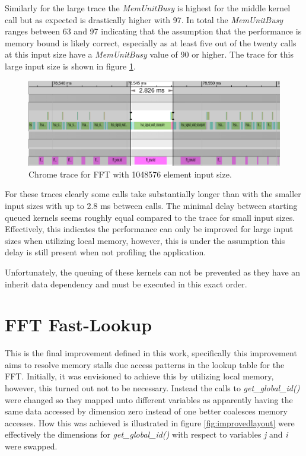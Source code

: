 \documentclass[conference]{IEEEtran}
\begin{document}
Similarly for the large trace the \textit{MemUnitBusy} is highest for the
middle kernel call but as expected is drastically higher with 97. In total the
\textit{MemUnitBusy} ranges between 63 and 97 indicating that the assumption
that the performance is memory bound is likely correct, especially as at least
five out of the twenty calls at this input size have a \textit{MemUnitBusy}
value of 90 or higher. The trace for this large input size is shown in figure
\ref{fig:tracelarge}.

\begin{figure}[H]
	\centering
	\includegraphics[width=1\linewidth]{resources/images/trace-1048576.png}
	\caption{Chrome trace for FFT with 1048576 element input size.}
	\label{fig:tracelarge}
\end{figure}

For these traces clearly some calls take substantially longer than with the
smaller input sizes with up to 2.8 ms between calls. The minimal delay between 
starting queued kernels seems roughly equal compared to the trace for small
input sizes. Effectively, this indicates the performance can only be improved 
for large input sizes when utilizing local memory, however, this is under the
assumption this delay is still present when not profiling the application.

Unfortunately, the queuing of these kernels can not be prevented as they have
an inherit data dependency and must be executed in this exact order.

\section{FFT Fast-Lookup}

This is the final improvement defined in this work, specifically this
improvement aims to resolve memory stalls due access patterns in the lookup
table for the FFT. Initially, it was envisioned to achieve this by utilizing
local memory, however, this turned out not to be necessary. Instead the
calls to \textit{get\_global\_id()} were changed so they mapped unto different
variables as apparently having the same data accessed by dimension zero instead
of one better coalesces memory accesses. How this was achieved is illustrated
in figure \ref{fig:improvedlayout} were effectively the dimensions for
\textit{get\_global\_id()} with respect to variables \textit{j} and \textit{i}
were swapped.
\end{document}
